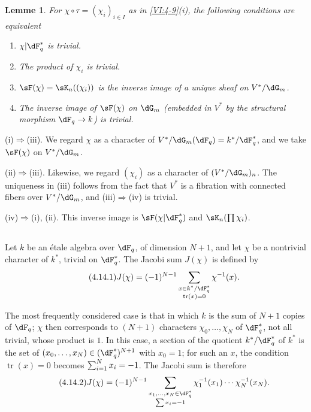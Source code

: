 \documentclass[oneside]{book}
\DeclareMathOperator{\tr}{tr}
\newcounter{char}
\theoremstyle{sga-source}
\theoremstyle{sga-source-dash}
\theoremstyle{sga-source-dotdash}
\theoremstyle{sga-source-number-note-dash}
\theoremstyle{sga-source-note-number-dotdash}
\theoremstyle{sga-source-example-dotdash}
\theoremstyle{sga-source-inline-number}
\theoremstyle{sga-source-bare-number}
\theoremstyle{sga-source}
\newtheorem{lemma_}[subsection]{Lemme}
\begin{document}
\begin{lemma_}\label{VI:4-13}
For $\chi\circ \tau=(\chi_i)_{i\in I}$ as in \ref{VI:4-9}(i), the
following conditions are equivalent 
\begin{enumerate}[\indent (i)]
  \item $\chi| \dF_q^\ast$ is trivial. 
  \item The product of $\chi_i$ is trivial. 
  \item $\sF(\chi) = \sK_n((\chi_i))$ is the inverse image of a unique 
    sheaf on $V^\ast/\dG_m$. 
  \item The inverse image of $\sF(\chi)$ on $\dG_m$ (embedded in 
    $V^\ast$ by the structural morphism $\dF_q \to k$) is trivial. 
\end{enumerate}
\end{lemma_}

(i)$\Rightarrow$(iii). We regard $\chi$ as a character of 
$V^\ast/\dG_m(\dF_q)=k^\ast/\dF_q^\ast$, and we take $\sF(\chi)$ on 
$V^\ast/\dG_m$. 

(ii)$\Rightarrow$(iii). Likewise, we regard $(\chi_i)$ as a character 
of $(V^\ast/\dG_m)_n$. The uniqueness in (iii) follows from the fact that $V^\ast$ is 
a fibration with connected fibers over $V^\ast/\dG_m$, and (iii)$\Rightarrow$(iv)  
is trivial. 

(iv)$\Rightarrow$(i), (ii). This inverse image is 
$\sF(\chi|\dF_q^\ast)$ and $\sK_n(\prod \chi_i)$. 





\subsection{}\label{VI:4-14}

Let $k$ be an étale algebra over $\dF_q$, of 
dimension $N+1$, and let $\chi$ be a nontrivial character of $k^\ast$, trivial on 
$\dF_q^\ast$. The Jacobi sum $J(\chi)$ is defined by 
\begin{equation*}\tag{4.14.1}\label{VI:eq:4-14-1}
  J(\chi) = (-1)^{N-1} \sum_{\substack{x\in k^\ast/\dF_q^\ast \\ \tr(x)=0}} \chi^{-1}(x) \text{.} 
\end{equation*}

The most frequently considered case is that in which $k$ is the sum of $N+1$
copies of $\dF_q$; $\chi$ then corresponds to $(N+1)$ characters
$\chi_0,\ldots,\chi_N$ of $\dF_q^\ast$, not all trivial, whose product is $1$.
In this case, a section of the quotient $k^\ast/\dF_q^\ast$ of $k^\ast$
is the set of $(x_0,\ldots,x_N)\in\var{(k^\ast)^{N+1}}{(\dF_q^\ast)^{N+1}}{S45-SOL-0839}$ with $x_0=1$;
for such an $x$, the condition $\tr(x)=0$ becomes $\sum_{i=1}^{\var{n}{N}{S45-SOL-0840}}x_i=-1$.
The Jacobi sum is therefore
\begin{equation*}\tag{4.14.2}\label{VI:eq:4-14-2}
 J(\chi)=(-1)^{N-1}\sum_{\substack{x_1,\ldots,x_N\in\dF_q^\ast\\\sum x_i=-1}}
 \chi_1^{-1}(x_1)\cdots\var{\chi_n^{-1}(x_n)}{\chi_N^{-1}(x_N)}{S45-SOL-0841} \text{.}
\end{equation*}
\end{document}
